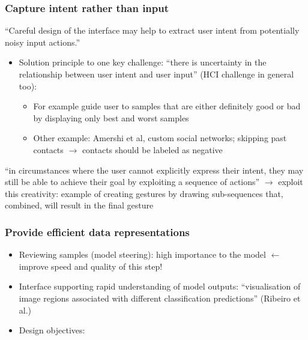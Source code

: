 \documentclass[12pt,a4paper]{article}
\begin{document}
\subsubsection{Capture intent rather than input}
\begin{description}
\item ``Careful design of the interface may help to extract user intent from potentially noisy input actions.''
\end{description}
\begin{itemize}
\item Solution principle to one key challenge: ``there is uncertainty in the relationship between user intent and user input'' (HCI challenge in general too):
\begin{itemize}
\item For example guide user to samples that are either definitely good or bad by displaying only best and worst samples
\item Other example: Amershi et al, custom social networks; skipping past contacts $\rightarrow$ contacts should be labeled as negative
\end{itemize}
\end{itemize}
\begin{description}
\item ``in circumstances where the user cannot explicitly express their intent, they may still be able to achieve their goal by exploiting a sequence of actions'' $\rightarrow$ exploit this creativity: example of creating gestures by drawing sub-sequences that, combined, will result in the final gesture
\end{description}
\subsubsection{Provide efficient data representations}
\begin{itemize}
\item Reviewing samples (model steering): high importance to the model $\leftarrow$ improve speed and quality of this step!
\item Interface supporting rapid understanding of model outputs: ``visualisation of image regions associated with different classification predictions'' (Ribeiro et al.)
\item Design objectives:
\end{itemize}
\end{document}
